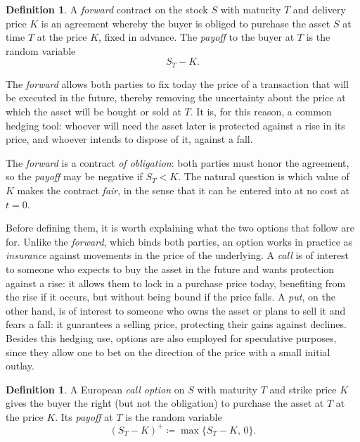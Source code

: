 \documentclass[11pt,a4paper,oneside]{report}
\theoremstyle{plain}
\theoremstyle{definition}
\newtheorem{definicion}[teorema]{Definition}
\theoremstyle{remark}
\newcommand{\1}{\mathbf{1}}
\newcommand{\eqdef}{\coloneqq}
\begin{document}
\begin{definicion}
A \emph{forward} contract on the stock $S$ with maturity $T$ and
delivery price $K$ is an agreement whereby the buyer is obliged to
purchase the asset $S$ at time $T$ at the price $K$, fixed in advance.
The \emph{payoff} to the buyer at $T$ is the random variable
\begin{equation*}
  S_T - K.
\end{equation*}
\end{definicion}

The \emph{forward} allows both parties to fix today the price of a
transaction that will be executed in the future, thereby removing the
uncertainty about the price at which the asset will be bought or sold
at $T$. It is, for this reason, a common hedging tool: whoever will
need the asset later is protected against a rise in its price, and
whoever intends to dispose of it, against a fall.

The \emph{forward} is a contract \emph{of obligation}: both parties
must honor the agreement, so the \emph{payoff} may be negative if
$S_T < K$. The natural question is which value of $K$ makes the
contract \emph{fair}, in the sense that it can be entered into at no
cost at $t = 0$.

\medskip

Before defining them, it is worth explaining what the two options that
follow are for. Unlike the \emph{forward}, which binds both parties,
an option works in practice as \emph{insurance} against movements in
the price of the underlying. A \emph{call} is of interest to someone
who expects to buy the asset in the future and wants protection
against a rise: it allows them to lock in a purchase price today,
benefiting from the rise if it occurs, but without being bound if the
price falls. A \emph{put}, on the other hand, is of interest to someone
who owns the asset or plans to sell it and fears a fall: it guarantees
a selling price, protecting their gains against declines. Besides this
hedging use, options are also employed for speculative purposes, since
they allow one to bet on the direction of the price with a small
initial outlay.

\begin{definicion}
A European \emph{call option} on $S$ with maturity $T$ and strike
price $K$ gives the buyer the right (but not the obligation) to
purchase the asset at $T$ at the price $K$. Its \emph{payoff} at $T$
is the random variable
\begin{equation*}
  (S_T - K)^+ \eqdef \max\{S_T - K,\, 0\}.
\end{equation*}
\end{definicion}
\end{document}
